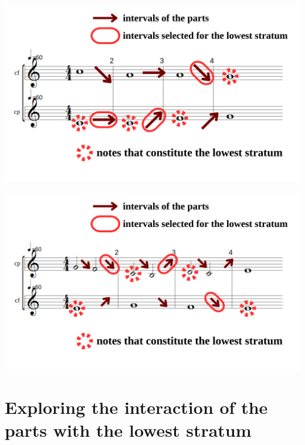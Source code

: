 \vspace{.5cm}
\begin{minipage}{0.46\textwidth}
    \centering
    \includegraphics[width=\textwidth]{Images/stratum-m-intervals.png}
    \label{fig:stratum-m-intervals-1}
    \end{minipage}
    \hfill
    \begin{minipage}{0.46\textwidth}
      \centering
      \includegraphics[width=\textwidth]{Images/stratum-m-intervals2.png}
      \label{fig:stratum-m-intervals-2}
\end{minipage}
\vspace{.5cm}

\section{Exploring the interaction of the parts with the lowest stratum}



